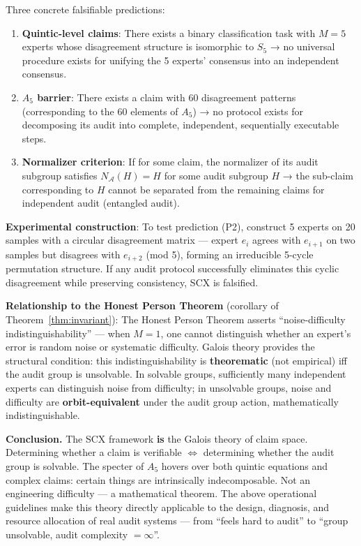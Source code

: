 \documentclass[10pt,a4paper]{article}
\theoremstyle{remark}
\begin{document}
Three concrete falsifiable predictions:
\begin{enumerate}[label=(P\arabic*)]
  \item \textbf{Quintic-level claims}: There exists a binary classification task with $M=5$ experts whose disagreement structure is isomorphic to $S_5$ → no universal procedure exists for unifying the 5 experts' consensus into an independent consensus.
  \item \textbf{$A_5$ barrier}: There exists a claim with 60 disagreement patterns (corresponding to the 60 elements of $A_5$) → no protocol exists for decomposing its audit into complete, independent, sequentially executable steps.
  \item \textbf{Normalizer criterion}: If for some claim, the normalizer of its audit subgroup satisfies $N_{\mathcal{A}}(H) = H$ for some audit subgroup $H$ → the sub-claim corresponding to $H$ cannot be separated from the remaining claims for independent audit (entangled audit).
\end{enumerate}

\textbf{Experimental construction}: To test prediction (P2), construct 5 experts on 20 samples with a circular disagreement matrix — expert $e_i$ agrees with $e_{i+1}$ on two samples but disagrees with $e_{i+2}$ (mod 5), forming an irreducible 5-cycle permutation structure. If any audit protocol successfully eliminates this cyclic disagreement while preserving consistency, SCX is falsified.

\textbf{Relationship to the Honest Person Theorem} (corollary of Theorem~\ref{thm:invariant}): The Honest Person Theorem asserts ``noise-difficulty indistinguishability'' — when $M=1$, one cannot distinguish whether an expert's error is random noise or systematic difficulty. Galois theory provides the structural condition: this indistinguishability is \textbf{theorematic} (not empirical) iff the audit group is unsolvable. In solvable groups, sufficiently many independent experts can distinguish noise from difficulty; in unsolvable groups, noise and difficulty are \textbf{orbit-equivalent} under the audit group action, mathematically indistinguishable.

\textbf{Conclusion.} The SCX framework \textbf{is} the Galois theory of claim space. Determining whether a claim is verifiable $\iff$ determining whether the audit group is solvable. The specter of $A_5$ hovers over both quintic equations and complex claims: certain things are intrinsically indecomposable. Not an engineering difficulty — a mathematical theorem. The above operational guidelines make this theory directly applicable to the design, diagnosis, and resource allocation of real audit systems — from ``feels hard to audit'' to ``group unsolvable, audit complexity $=\infty$''.
\end{document}
